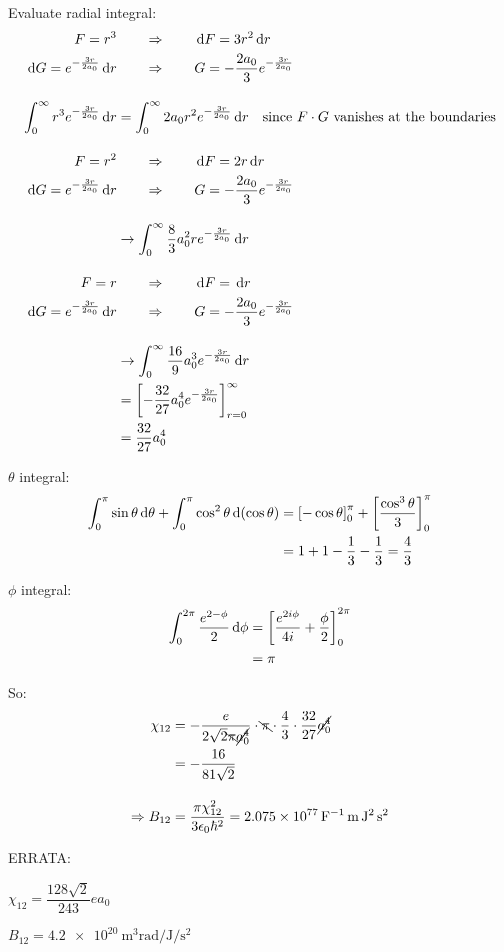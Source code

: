 \begin{parts}
	Evaluate radial integral:
	\begin{align*}
		F=r^3 &\qquad\Rightarrow\qquad \,\mathrm{d}{F}=3r^2 \,\mathrm{d}{r} \\
		\,\mathrm{d}{G}=e^{-\frac{3r}{2a_0}} \,\mathrm{d}{r} &\qquad\Rightarrow\qquad G=-\frac{2a_0}{3} e^{-\frac{3r}{2a_0}} \\[1em]
		\int_{0}^{\infty} {r^3 e^{-\frac{3r}{2a_0}}} \,\mathrm{d}{r} &= \int_{0}^{\infty} {2a_0 r^2 e^{-\frac{3r}{2a_0}}} \,\mathrm{d}{r} \textnormal{\hspace{1em}since $F \cdot G$ vanishes at the boundaries} \\[1em]
		F=r^2 &\qquad\Rightarrow\qquad \,\mathrm{d}{F}=2r \,\mathrm{d}{r} \\
		\,\mathrm{d}{G}=e^{-\frac{3r}{2a_0}} \,\mathrm{d}{r} &\qquad\Rightarrow\qquad G=-\frac{2a_0}{3} e^{-\frac{3r}{2a_0}} \\[1em]
		&\rightarrow \int_{0}^{\infty} {\frac{8}{3}a_0^2 r e^{-\frac{3r}{2a_0}}} \,\mathrm{d}{r} \\[1em]
		F=r &\qquad\Rightarrow\qquad \,\mathrm{d}{F}=\,\mathrm{d}{r} \\
		\,\mathrm{d}{G}=e^{-\frac{3r}{2a_0}} \,\mathrm{d}{r} &\qquad\Rightarrow\qquad G=-\frac{2a_0}{3} e^{-\frac{3r}{2a_0}} \\[1em]
		&\rightarrow \int_{0}^{\infty} {\frac{16}{9}a_0^3 e^{-\frac{3r}{2a_0}}} \,\mathrm{d}{r} \\
		&= \left[-\frac{32}{27}a_0^4 e^{-\frac{3r}{2a_0}}\right]_{r=0}^\infty \\
		&= \frac{32}{27}a_0^4
	\end{align*}
	
	$\theta$ integral:
	\begin{align*}
		\int_{0}^{\pi} {\sin\theta} \,\mathrm{d}{\theta} + \int_{0}^{\pi} {\cos^2 \theta} \,\mathrm{d}{\left(\cos\theta\right)} &= \left[-\cos\theta\right]_0^\pi + \left[\frac{\cos^3 \theta}{3}\right]_0^\pi \\
		&= 1 + 1 - \frac{1}{3} - \frac{1}{3} = \frac{4}{3}
	\end{align*}
	
	$\phi$ integral:
	\begin{align*}
		\int_{0}^{2\pi} {\frac{e^{2-\phi}}{2}} \,\mathrm{d}{\phi} &= \left[\frac{e^{2i\phi}}{4i} + \frac{\phi}{2}\right]_0^{2\pi} \\
		&= \pi
	\end{align*}
	
	So:
	\begin{align*}
		\chi_{12} &= -\frac{e}{2\sqrt{2}\bcancel{\pi}\cancel{a_0^4}} \cdot \bcancel{\pi} \cdot \frac{4}{3} \cdot \frac{32}{27} \cancel{a_0^4} \\
		&= -\frac{16}{81\sqrt{2}} \\[1em]
		\Rightarrow B_{12} &= \frac{\pi\chi_{12}^2}{3\epsilon_{0}\hbar^2} = \SI{2.075e77}{\per\farad\metre\joule\squared\second\squared}
	\end{align*}
	
	ERRATA:
	
	$\chi_{12} = \dfrac{128\sqrt{2}}{243} ea_0$
	
	$B_{12} = \SI{4.2e20}{\metre\cubed\radian\per\joule\per\second\squared}$
\end{parts}
